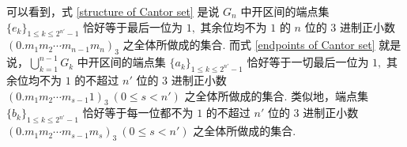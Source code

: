 \documentclass[12pt, a4paper, oneside]{book}
\numberwithin{figure}{section}
\theoremstyle{definition}
\begin{document}
\begin{comment}
式 \eqref{a_k recurrence relation} 可以写为
\begin{equation}
    a_{2^k+j} = a_{j}+{2\over 3^{n-k}},\ k=0,1,2,\cdots,n-1,\ j=1,2,\cdots,2^k-1
\end{equation}
因此若 $m=2^{k_1}+ 2^{k_2}+\cdots+2^{k_s},$ 其中 $0\leq k_1<k_2<\cdots<k_s<n,$  那么当 $s>1$ 时就有
\begin{equation}
    \begin{aligned}
        a_m = a_{2^{k_s}+2^{k_{s-1}}+\cdots+2^{k_1}}=&a_{2^{k_{s-1}}+\cdots+2^{k_1}}+{2\over 3^{n-k_s}}\\
        =&a_{2^{k_{s-2}}+\cdots+2^{k_1}}+{2\over 3^{n-k_{s-1}}}+{2\over 3^{n-k_s}}\\
        =&\cdots\\
        =&a_{2^{k_1}}+{2\over 3^{n-k_2}}+\cdots+{2\over 3^{n-k_s}}\\
        =&{1\over 3^{n-k_1}}+\sum_{j=2}^s {2\over 3^{n-k_j}}
    \end{aligned}
\end{equation}
以及
\begin{equation}
    \begin{aligned}
        b_m = b_{2^{k_s}+2^{k_{s-1}}+\cdots+2^{k_1}}=&b_{2^{k_{s-1}}+\cdots+2^{k_1}}+{2\over 3^{n-k_s}}\\
        =&b_{2^{k_{s-2}}+\cdots+2^{k_1}}+{2\over 3^{n-k_{s-1}}}+{2\over 3^{n-k_s}}\\
        =&\cdots\\
        =&b_{2^{k_1}}+{2\over 3^{n-k_2}}+{2\over 3^{n-k_s}}\\
        =&\sum_{j=1}^s {2\over 3^{n-k_j}}
    \end{aligned}
\end{equation}

总之，定义函数 $f:\mathbb N\to\mathbb N\cup\{0\}$ 将正整数映射为其二进制表示的最低非零位，以及 $g:\mathbb N\to \mathbb R$ 为 $\sum_j m_j 2^j\mapsto \sum_j {2m_j\over 3^{n-j}},$ 那么
对每一个 $1\leq k\leq 2^n-1$ 均有
\begin{equation}
    \left\{
        \begin{aligned}
            a_k =& g(k)-{1\over 3^{n-f(k)}},\\
            b_k =& g(k)
        \end{aligned}
    \right.
\end{equation}
\end{comment}

可以看到，式 \eqref{structure of Cantor set} 是说 $G_n$ 中开区间的端点集 $\{e_k\}_{1\leq k\leq 2^{n'}-1}$ 恰好等于最后一位为 $1,$ 其余位均不为 $1$ 的 $n$ 位的 $3$ 进制正小数 $(0.m_1m_2\cdots m_{n-1}m_n)_3$ 之全体所做成的集合.
而式 \eqref{endpoints of Cantor set} 就是说，$\bigcup_{k=1}^{n-1}G_k$ 中开区间的端点集 $\{a_k\}_{1\leq k\leq 2^{n'}-1}$ 恰好等于一切最后一位为 $1,$ 其余位均不为 $1$ 的不超过 $n'$ 位的 $3$ 进制正小数 $(0.m_1m_2\cdots m_{s-1}1)_3\ (0\leq s<n')$ 之全体所做成的集合. 类似地，端点集 $\{b_k\}_{1\leq k\leq 2^{n'}-1}$ 
恰好等于每一位都不为 $1$ 的不超过 $n'$ 位的 $3$ 进制正小数 $(0.m_1m_2\cdots m_{s-1}m_s)_3\ (0\leq s<n')$ 之全体所做成的集合.
\end{document}
